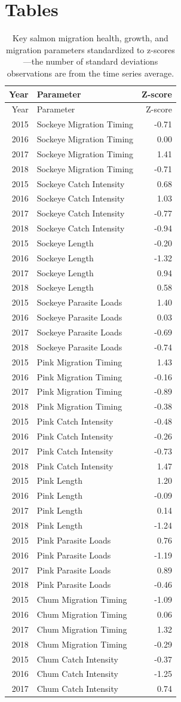 \documentclass[fleqn,10pt]{wlpeerj} %
\begin{document}
\section{Tables}\label{tables}

\begin{longtable}[]{@{}rlr@{}}
\caption{\label{tab:z-scores-table} Key salmon migration health, growth, and
migration parameters standardized to z-scores---the number of standard
deviations observations are from the time series
average.}\tabularnewline
\toprule
Year & Parameter & Z-score\tabularnewline
\midrule
\endfirsthead
\toprule
Year & Parameter & Z-score\tabularnewline
\midrule
\endhead
2015 & Sockeye Migration Timing & -0.71\tabularnewline
2016 & Sockeye Migration Timing & 0.00\tabularnewline
2017 & Sockeye Migration Timing & 1.41\tabularnewline
2018 & Sockeye Migration Timing & -0.71\tabularnewline
2015 & Sockeye Catch Intensity & 0.68\tabularnewline
2016 & Sockeye Catch Intensity & 1.03\tabularnewline
2017 & Sockeye Catch Intensity & -0.77\tabularnewline
2018 & Sockeye Catch Intensity & -0.94\tabularnewline
2015 & Sockeye Length & -0.20\tabularnewline
2016 & Sockeye Length & -1.32\tabularnewline
2017 & Sockeye Length & 0.94\tabularnewline
2018 & Sockeye Length & 0.58\tabularnewline
2015 & Sockeye Parasite Loads & 1.40\tabularnewline
2016 & Sockeye Parasite Loads & 0.03\tabularnewline
2017 & Sockeye Parasite Loads & -0.69\tabularnewline
2018 & Sockeye Parasite Loads & -0.74\tabularnewline
2015 & Pink Migration Timing & 1.43\tabularnewline
2016 & Pink Migration Timing & -0.16\tabularnewline
2017 & Pink Migration Timing & -0.89\tabularnewline
2018 & Pink Migration Timing & -0.38\tabularnewline
2015 & Pink Catch Intensity & -0.48\tabularnewline
2016 & Pink Catch Intensity & -0.26\tabularnewline
2017 & Pink Catch Intensity & -0.73\tabularnewline
2018 & Pink Catch Intensity & 1.47\tabularnewline
2015 & Pink Length & 1.20\tabularnewline
2016 & Pink Length & -0.09\tabularnewline
2017 & Pink Length & 0.14\tabularnewline
2018 & Pink Length & -1.24\tabularnewline
2015 & Pink Parasite Loads & 0.76\tabularnewline
2016 & Pink Parasite Loads & -1.19\tabularnewline
2017 & Pink Parasite Loads & 0.89\tabularnewline
2018 & Pink Parasite Loads & -0.46\tabularnewline
2015 & Chum Migration Timing & -1.09\tabularnewline
2016 & Chum Migration Timing & 0.06\tabularnewline
2017 & Chum Migration Timing & 1.32\tabularnewline
2018 & Chum Migration Timing & -0.29\tabularnewline
2015 & Chum Catch Intensity & -0.37\tabularnewline
2016 & Chum Catch Intensity & -1.25\tabularnewline
2017 & Chum Catch Intensity & 0.74\tabularnewline

\end{longtable}
\end{document}
